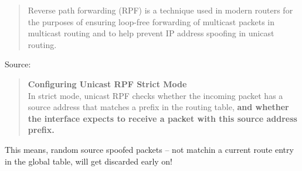 \documentclass[Screen16to9,17pt]{foils}
\begin{document}

\begin{quote}
Reverse path forwarding (RPF) is a technique used in modern routers for the purposes of ensuring loop-free forwarding of multicast packets in multicast routing and to help prevent IP address spoofing in unicast routing.
\end{quote}
Source: 

\begin{quote}
{\bf Configuring Unicast RPF Strict Mode}\\
In strict mode, unicast RPF checks whether the incoming packet has a source address that matches a prefix in the routing table, {\bf and whether the interface expects to receive a packet with this source address prefix.}
\end{quote}

This means, random source spoofed packets -- not matchin a current route entry in the global table, will get discarded early on!


\end{document}

